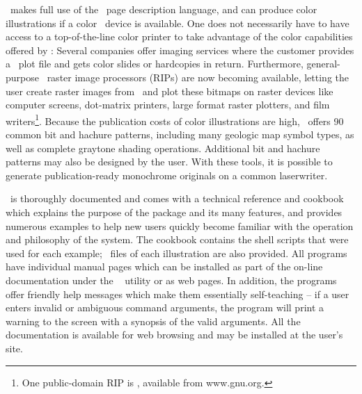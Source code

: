 \GMT\ makes full use of the \PS\ page description language, and can produce color illustrations
if a color \PS\ device is available.  One does not
necessarily have to have access to a top-of-the-line color printer
to take advantage of the color capabilities offered by \GMT: Several
companies offer imaging services where the customer provides a
\PS\ plot file and gets color slides or hardcopies in return.
Furthermore, general-purpose \PS\ raster image processors
(RIPs) are now becoming available, letting the user create raster images
from \PS\ and plot these bitmaps on raster devices like computer
screens, dot-matrix printers, large format raster plotters, and film
writers\footnote{One public-domain RIP is ,
available from www.gnu.org.}.
Because the publication costs of color illustrations are high,
\GMT\ offers 90 common bit and hachure patterns, including many geologic
map symbol types, as well as complete graytone shading operations.
Additional bit and hachure patterns may also be designed by the user.
With these tools, it is possible to generate publication-ready
monochrome originals on a common laserwriter. 

\GMT\ is thoroughly documented and comes with a technical reference and
cookbook which explains the purpose of the package and its many features,
and provides numerous examples to help new users quickly become familiar
with the operation and philosophy of the system.  The cookbook contains
the shell scripts that were used for each example; \PS\
files of each illustration are also provided.  All programs have
individual manual pages which can be installed as part of the on-line
documentation under the \UNIX\ \progname{man} utility or as web pages.  In addition, the
programs offer friendly help messages which make them essentially
self-teaching -- if a user enters invalid or ambiguous command arguments,
the program will print a warning to the screen with a synopsis of the
valid arguments.  All the documentation is available for web browsing
and may be installed at the user's site.

